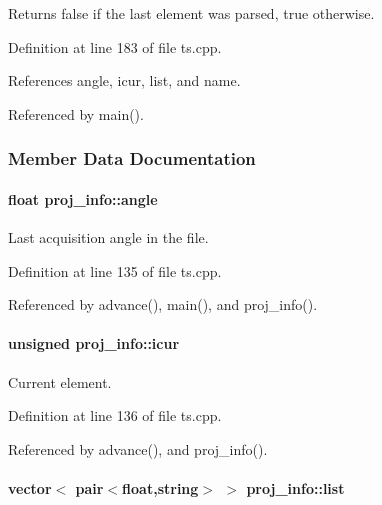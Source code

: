 \begin{DoxyReturn}{Returns}
{\ttfamily false} if the last element was parsed, {\ttfamily true} otherwise. 
\end{DoxyReturn}


Definition at line 183 of file ts.cpp.



References angle, icur, list, and name.



Referenced by main().



\subsubsection{Member Data Documentation}
\hypertarget{structproj__info_aa99f2ca1bcc4a59d8ccd12d089ec0157}{
\paragraph[{angle}]{\setlength{\rightskip}{0pt plus 5cm}float {\bf proj\_\-info::angle}}\hfill}
\label{structproj__info_aa99f2ca1bcc4a59d8ccd12d089ec0157}


Last acquisition angle in the file. 



Definition at line 135 of file ts.cpp.



Referenced by advance(), main(), and proj\_\-info().

\hypertarget{structproj__info_a811edc2345575bc4ec481a7d4056ff8f}{
\paragraph[{icur}]{\setlength{\rightskip}{0pt plus 5cm}unsigned {\bf proj\_\-info::icur}}\hfill}
\label{structproj__info_a811edc2345575bc4ec481a7d4056ff8f}


Current element. 



Definition at line 136 of file ts.cpp.



Referenced by advance(), and proj\_\-info().

\hypertarget{structproj__info_ac314c7bb7162e89f365ff571b8905882}{
\paragraph[{list}]{\setlength{\rightskip}{0pt plus 5cm}vector$<$ pair$<$float,string$>$ $>$ {\bf proj\_\-info::list}}\hfill}
\label{structproj__info_ac314c7bb7162e89f365ff571b8905882}


